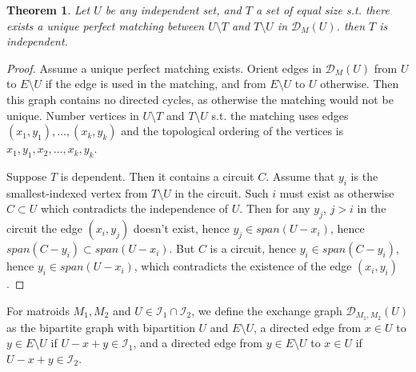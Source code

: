 \documentclass{article}
\newtheorem{theorem}{Theorem}[section]
\begin{document}
\begin{theorem}
Let $U$ be any independent set, and $T$ a set of equal size s.t. there exists a unique perfect matching between $U \setminus T$ and $T \setminus U$ in $\mathcal{D}_{M}(U)$.
then $T$ is independent.
\end{theorem}
\begin{proof}
Assume a unique perfect matching exists. Orient edges in $\mathcal{D}_{M}(U)$ from $U$ to $E \setminus U$ if the edge is used in the matching,
and from $E \setminus U$ to $U$ otherwise. Then this graph contains no directed cycles, as otherwise the matching would not be unique. Number
vertices in $U \setminus T$ and $T \setminus U$ s.t. the matching uses edges $(x_{1}, y_{1}), \dots, (x_{k}, y_{k})$ and the topological ordering
of the vertices is $x_{1}, y_{1}, x_{2}, \dots, x_{k}, y_{k}$.

Suppose $T$ is dependent. Then it contains a circuit $C$. Assume that $y_{i}$ is the smallest-indexed vertex from $T \setminus U$ in the circuit.
Such $i$ must exist as otherwise $C \subset U$ which contradicts the independence of $U$.
Then for any $y_{j}$, $j > i$ in the circuit the edge $(x_{i}, y_{j})$ doesn't exist, hence $y_{j} \in span(U - x_{i})$,
hence $span(C - y_{i}) \subset span(U - x_{i})$. But $C$ is a circuit, hence $y_{i} \in span(C - y_{i})$, hence $y_{i} \in span(U - x_{i})$,
which contradicts the existence of the edge $(x_{i}, y_{i})$.
\end{proof}

For matroids $M_{1}, M_{2}$ and $U \in \mathcal{I}_{1} \cap \mathcal{I}_{2}$,
we define the exchange graph $\mathcal{D}_{M_{1}, M_{2}}(U)$ as the bipartite graph with bipartition $U$ and $E \setminus U$,
a directed edge from $x \in U$ to $y \in E \setminus U$ if $U - x + y \in \mathcal{I}_{1}$,
and a directed edge from $y \in E \setminus U$ to $x \in U$ if $U - x + y \in \mathcal{I}_{2}$.
\end{document}
